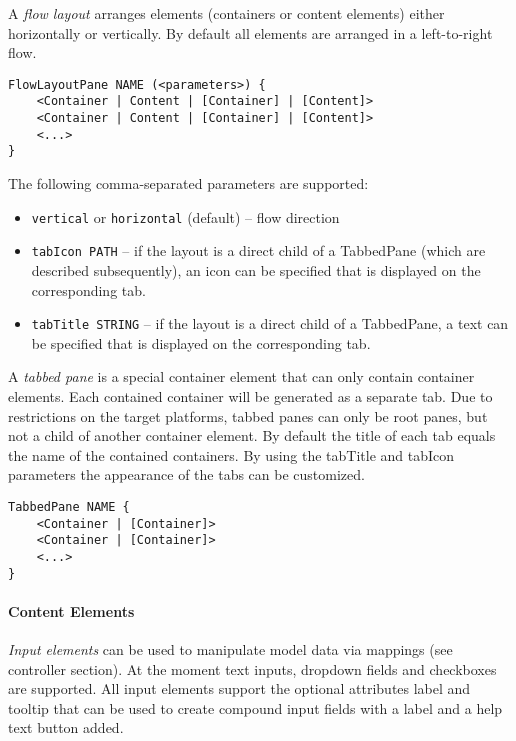 A \textit{flow layout} arranges elements (containers or content elements) either horizontally or vertically. By default all elements are arranged in a left-to-right flow.
\begin{lstlisting}
FlowLayoutPane NAME (<parameters>) {
	<Container | Content | [Container] | [Content]>
	<Container | Content | [Container] | [Content]>
	<...>
}
\end{lstlisting}
The following comma-separated parameters are supported:
\begin{itemize}
\item \lstinline!vertical! or \lstinline!horizontal! (default) -- flow direction
\item \lstinline!tabIcon PATH! -- if the layout is a direct child of a TabbedPane (which are described subsequently), an icon can be specified that is displayed on the corresponding tab.
\item \lstinline!tabTitle STRING! -- if the layout is a direct child of a TabbedPane, a text can be specified that is displayed on the corresponding tab.
\end{itemize}

A \textit{tabbed pane} is a special container element that can only contain container elements. Each contained container will be generated as a separate tab. Due to restrictions on the target platforms, tabbed panes can only be root panes, but not a child of another container element. By default the title of each tab equals the name of the contained containers. By using the tabTitle and tabIcon parameters the appearance of the tabs can be customized.
\begin{lstlisting}
TabbedPane NAME {
	<Container | [Container]>
	<Container | [Container]>
	<...>
}
\end{lstlisting}

\paragraph{Content Elements}
\textit{Input elements} can be used to manipulate model data via mappings (see controller section). At the moment text inputs, dropdown fields and checkboxes are supported. All input elements support the optional attributes label and tooltip that can be used to create compound input fields with a label and a help text button added.

